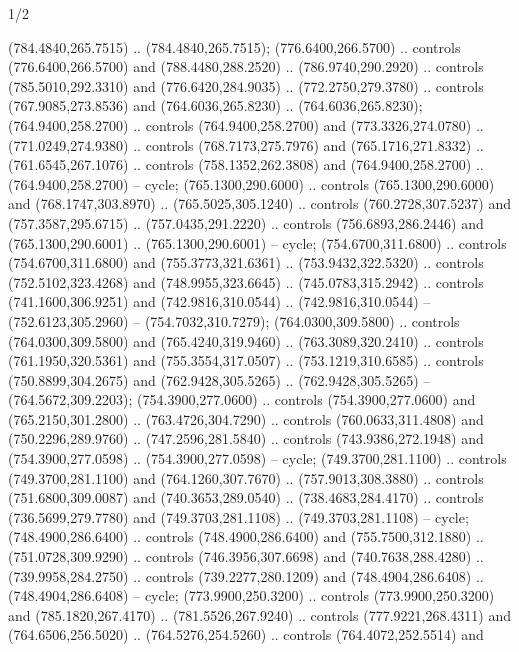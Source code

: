 \begin{flagdescription}{1/2}
\begin{scope}[xshift=0.5\flaglength,yshift=0.5\flagwidth,scale=\flagwidth/759]
\begin{scope}[y=0.8pt, x=0.8pt, yscale=-1,shift={(-720,-480)}]
\begin{scope}[draw=black,fill=c452c25,line width=0.438\lw]
  (784.4840,265.7515) .. (784.4840,265.7515);
 (776.6400,266.5700) .. controls (776.6400,266.5700) and
  (788.4480,288.2520) .. (786.9740,290.2920) .. controls (785.5010,292.3310) and
  (776.6420,284.9035) .. (772.2750,279.3780) .. controls (767.9085,273.8536) and
  (764.6036,265.8230) .. (764.6036,265.8230);
 (764.9400,258.2700) .. controls (764.9400,258.2700) and
  (773.3326,274.0780) .. (771.0249,274.9380) .. controls (768.7173,275.7976) and
  (765.1716,271.8332) .. (761.6545,267.1076) .. controls (758.1352,262.3808) and
  (764.9400,258.2700) .. (764.9400,258.2700) -- cycle;
 (765.1300,290.6000) .. controls (765.1300,290.6000) and
  (768.1747,303.8970) .. (765.5025,305.1240) .. controls (760.2728,307.5237) and
  (757.3587,295.6715) .. (757.0435,291.2220) .. controls (756.6893,286.2446) and
  (765.1300,290.6001) .. (765.1300,290.6001) -- cycle;
 (754.6700,311.6800) .. controls (754.6700,311.6800) and
  (755.3773,321.6361) .. (753.9432,322.5320) .. controls (752.5102,323.4268) and
  (748.9955,323.6645) .. (745.0783,315.2942) .. controls (741.1600,306.9251) and
  (742.9816,310.0544) .. (742.9816,310.0544) -- (752.6123,305.2960) --
  (754.7032,310.7279);
 (764.0300,309.5800) .. controls (764.0300,309.5800) and
  (765.4240,319.9460) .. (763.3089,320.2410) .. controls (761.1950,320.5361) and
  (755.3554,317.0507) .. (753.1219,310.6585) .. controls (750.8899,304.2675) and
  (762.9428,305.5265) .. (762.9428,305.5265) -- (764.5672,309.2203);
 (754.3900,277.0600) .. controls (754.3900,277.0600) and
  (765.2150,301.2800) .. (763.4726,304.7290) .. controls (760.0633,311.4808) and
  (750.2296,289.9760) .. (747.2596,281.5840) .. controls (743.9386,272.1948) and
  (754.3900,277.0598) .. (754.3900,277.0598) -- cycle;
 (749.3700,281.1100) .. controls (749.3700,281.1100) and
  (764.1260,307.7670) .. (757.9013,308.3880) .. controls (751.6800,309.0087) and
  (740.3653,289.0540) .. (738.4683,284.4170) .. controls (736.5699,279.7780) and
  (749.3703,281.1108) .. (749.3703,281.1108) -- cycle;
 (748.4900,286.6400) .. controls (748.4900,286.6400) and
  (755.7500,312.1880) .. (751.0728,309.9290) .. controls (746.3956,307.6698) and
  (740.7638,288.4280) .. (739.9958,284.2750) .. controls (739.2277,280.1209) and
  (748.4904,286.6408) .. (748.4904,286.6408) -- cycle;
 (773.9900,250.3200) .. controls (773.9900,250.3200) and
  (785.1820,267.4170) .. (781.5526,267.9240) .. controls (777.9221,268.4311) and
  (764.6506,256.5020) .. (764.5276,254.5260) .. controls (764.4072,252.5514) and

\end{scope}
\end{scope}
\end{scope}
\end{flagdescription}
